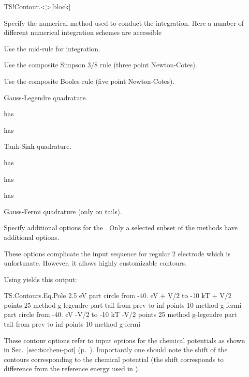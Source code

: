 \begin{fdfentry}{TS!Contour.<>}[block]
\begin{fdfoptions}
    Specify the numerical method used to conduct the integration. Here
    a number of different numerical integration schemes are accessible

    \begin{fdfoptions}
      Use the mid-rule for integration.

      Use the composite Simpson $3/8$ rule (three point Newton-Cotes).

      Use the composite Booles rule (five point Newton-Cotes).
 
      \option[G-legendre]%
      Gauss-Legendre quadrature.

      \note has 
      
      \note has 

      Tanh-Sinh quadrature.

      \note has 

      \note has 
      
      \note has 

      \option[G-Fermi]%
      Gauss-Fermi quadrature (only on tails).

    \end{fdfoptions}

    \option[opt]%

    Specify additional options for the . Only a selected
    subset of the methods have additional options.

  \end{fdfoptions}
  
\end{fdfentry}

These options complicate the input sequence for regular $2$ electrode
which is unfortunate. However, it allows highly customizable contours.

Using  yields this output:
\begin{fdfexample}
  TS.Contours.Eq.Pole 2.5 eV
    part circle
     from -40. eV + V/2 to -10 kT + V/2
       points 25
        method g-legendre
    part tail
     from prev to inf
       points 10
        method g-fermi
    part circle
     from -40. eV -V/2 to -10 kT -V/2
       points 25
        method g-legendre
    part tail
     from prev to inf
       points 10
        method g-fermi
\end{fdfexample}
These contour options refer to input options for the chemical
potentials as shown in Sec.~\ref{sec:ts:chem-pot}
(p.~\pageref{sec:ts:chem-pot}). Importantly one should note the shift
of the contours corresponding to the chemical potential (the shift
corresponds to difference from the reference energy used in \tsiesta).


